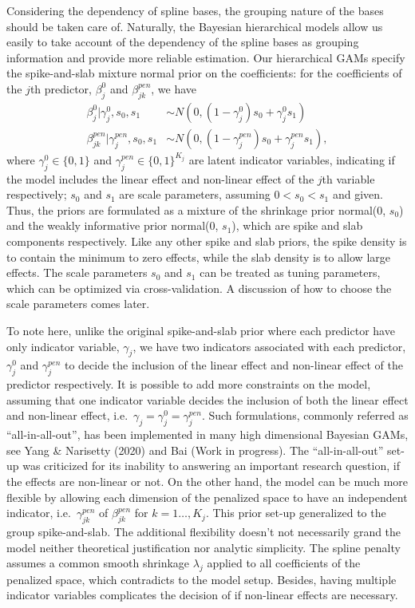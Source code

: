 \documentclass[AMA,STIX1COL,]{WileyNJD-v2}
\begin{document}
Considering the dependency of spline bases, the grouping nature of the
bases should be taken care of. Naturally, the Bayesian hierarchical
models allow us easily to take account of the dependency of the spline
bases as grouping information and provide more reliable estimation. Our
hierarchical GAMs specify the spike-and-slab mixture normal prior on the
coefficients: for the coefficients of the \(j\)th predictor,
\(\beta^0_j\) and \(\beta^{pen}_{jk}\), we have \[
\begin{aligned}
  \beta^0_{j} |\gamma^0_{j},s_0,s_1 &\sim N(0,(1-\gamma^0_{j}) s_0 + \gamma^0_{j} s_1)\\
  \beta^{pen}_{jk} | \gamma^{pen}_{j},s_0,s_1 &\sim N(0,(1-\gamma^{pen}_{j}) s_0 + \gamma^{pen}_{j} s_1), 
\end{aligned}
\] where \(\gamma^0_{j}\in\{0,1\}\) and
\(\gamma^{pen}_{j}\in \{0,1\}^{K_j}\) are latent indicator variables,
indicating if the model includes the linear effect and non-linear effect
of the \(j\)th variable respectively; \(s_0\) and \(s_1\) are scale
parameters, assuming \(0 < s_0 < s_1\) and given. Thus, the priors are
formulated as a mixture of the shrinkage prior normal(0, \(s_0\)) and
the weakly informative prior normal(0, \(s_1\)), which are spike and
slab components respectively. Like any other spike and slab priors, the
spike density is to contain the minimum to zero effects, while the slab
density is to allow large effects. The scale parameters \(s_0\) and
\(s_1\) can be treated as tuning parameters, which can be optimized via
cross-validation. A discussion of how to choose the scale parameters
comes later.

To note here, unlike the original spike-and-slab prior where each
predictor have only indicator variable, \(\gamma_j\), we have two
indicators associated with each predictor, \(\gamma^0_j\) and
\(\gamma^{pen}_j\) to decide the inclusion of the linear effect and
non-linear effect of the predictor respectively. It is possible to add
more constraints on the model, assuming that one indicator variable
decides the inclusion of both the linear effect and non-linear effect,
i.e.~\(\gamma_j = \gamma^0_j = \gamma^{pen}_j\). Such formulations,
commonly referred as ``all-in-all-out'', has been implemented in many
high dimensional Bayesian GAMs, see Yang \& Narisetty (2020) and Bai
(Work in progress). The ``all-in-all-out'' set-up was criticized for its
inability to answering an important research question, if the effects
are non-linear or not. On the other hand, the model can be much more
flexible by allowing each dimension of the penalized space to have an
independent indicator, i.e.~\(\gamma^{pen}_{jk}\) of
\(\beta^{pen}_{jk}\) for \(k = 1\dots, K_j\). This prior set-up
generalized to the group spike-and-slab. The additional flexibility
doesn't not necessarily grand the model neither theoretical
justification nor analytic simplicity. The spline penalty assumes a
common smooth shrinkage \(\lambda_j\) applied to all coefficients of the
penalized space, which contradicts to the model setup. Besides, having
multiple indicator variables complicates the decision of if non-linear
effects are necessary.
\end{document}
